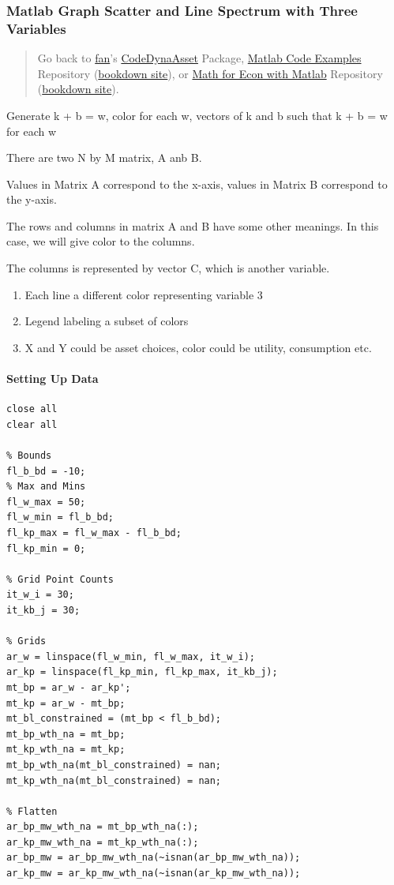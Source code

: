 \documentclass[
]{book}
\begin{document}
\hypertarget{matlab-graph-scatter-and-line-spectrum-with-three-variables}{%
\subsubsection{Matlab Graph Scatter and Line Spectrum with Three Variables}\label{matlab-graph-scatter-and-line-spectrum-with-three-variables}}

\begin{quote}
Go back to \href{http://fanwangecon.github.io/}{fan}'s \href{https://fanwangecon.github.io/CodeDynaAsset/}{CodeDynaAsset} Package, \href{https://fanwangecon.github.io/M4Econ/}{Matlab Code Examples} Repository (\href{https://fanwangecon.github.io/M4Econ/bookdown}{bookdown site}), or \href{https://fanwangecon.github.io/Math4Econ/}{Math for Econ with Matlab} Repository (\href{https://fanwangecon.github.io/Math4Econ/bookdown}{bookdown site}).
\end{quote}

Generate k + b = w, color for each w, vectors of k and b such that k + b
= w for each w

There are two N by M matrix, A anb B.

Values in Matrix A correspond to the x-axis, values in Matrix B
correspond to the y-axis.

The rows and columns in matrix A and B have some other meanings. In this
case, we will give color to the columns.

The columns is represented by vector C, which is another variable.

\begin{enumerate}
\def\labelenumi{\arabic{enumi}.}
\item
  Each line a different color representing variable 3
\item
  Legend labeling a subset of colors
\item
  X and Y could be asset choices, color could be utility, consumption
  etc.
\end{enumerate}

\hypertarget{setting-up-data}{%
\paragraph{Setting Up Data}\label{setting-up-data}}

\begin{verbatim}
close all
clear all

% Bounds
fl_b_bd = -10;
% Max and Mins
fl_w_max = 50;
fl_w_min = fl_b_bd;
fl_kp_max = fl_w_max - fl_b_bd;
fl_kp_min = 0;

% Grid Point Counts
it_w_i = 30;
it_kb_j = 30;

% Grids
ar_w = linspace(fl_w_min, fl_w_max, it_w_i);
ar_kp = linspace(fl_kp_min, fl_kp_max, it_kb_j);
mt_bp = ar_w - ar_kp';
mt_kp = ar_w - mt_bp;
mt_bl_constrained = (mt_bp < fl_b_bd);
mt_bp_wth_na = mt_bp;
mt_kp_wth_na = mt_kp;
mt_bp_wth_na(mt_bl_constrained) = nan;
mt_kp_wth_na(mt_bl_constrained) = nan;

% Flatten
ar_bp_mw_wth_na = mt_bp_wth_na(:);
ar_kp_mw_wth_na = mt_kp_wth_na(:);
ar_bp_mw = ar_bp_mw_wth_na(~isnan(ar_bp_mw_wth_na));
ar_kp_mw = ar_kp_mw_wth_na(~isnan(ar_kp_mw_wth_na));
\end{verbatim}
\end{document}
